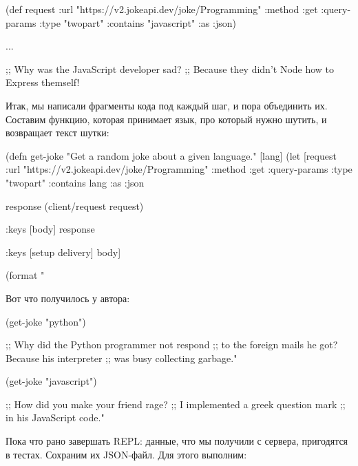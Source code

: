 \begin{english}
  \begin{clojure}
(def request
  {:url "https://v2.jokeapi.dev/joke/Programming"
   :method :get
   :query-params {:type "twopart" :contains "javascript"}
   :as :json})

...

;; Why was the JavaScript developer sad?
;; Because they didn't Node how to Express themself!
  \end{clojure}
\end{english}

Итак, мы написали фрагменты кода под каждый шаг, и пора объединить их. Составим функцию, которая принимает язык, про который нужно шутить, и возвращает текст шутки:

\begin{english}
  \begin{clojure}
(defn get-joke
  "Get a random joke about a given language."
  [lang]
  (let [request
        {:url "https://v2.jokeapi.dev/joke/Programming"
         :method :get
         :query-params {:type "twopart" :contains lang}
         :as :json}

        response
        (client/request request)

        {:keys [body]}
        response

        {:keys [setup delivery]}
        body]

    (format "%
  \end{clojure}
\end{english}

\pagebreaklarge

Вот что получилось у автора:

\begin{english}
  \begin{clojure}
(get-joke "python")

;; Why did the Python programmer not respond
;; to the foreign mails he got? Because his interpreter
;; was busy collecting garbage."

(get-joke "javascript")

;; How did you make your friend rage?
;; I implemented a greek question mark
;; in his JavaScript code."
  \end{clojure}
\end{english}

Пока что рано завершать REPL: данные, что мы получили с сервера, пригодятся в тестах. Сохраним их JSON-файл. Для этого выполним:


